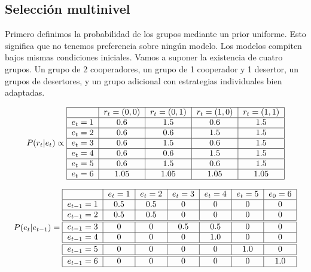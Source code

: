 \documentclass[a4paper,10pt]{article}
\begin{document}
\subsection{Selección multinivel}

Primero definimos la probabilidad de los grupos mediante un prior uniforme.
Esto significa que no tenemos preferencia sobre ningún modelo.
Los modelos compiten bajos mismas condiciones iniciales.
Vamos a suponer la existencia de cuatro grupos.
Un grupo de 2 cooperadores, un grupo de 1 cooperador y 1 desertor, un grupos de desertores, y un grupo adicional con estrategias individuales bien adaptadas.

\begin{align}
\centering
P(r_{t}|e_{t}) \propto \begin{tabular}{|c|c|c|c|c|c|c|}
        \hline
        & $r_t=(0,0)$ & $r_t=(0,1)$ & $r_t=(1,0)$ &  $r_t=(1,1)$  \\ \hline
       $e_{t}=1$ & $0.6$ & $1.5$ & $0.6$ & $1.5$ \\ \hline
       $e_{t}=2$ & $0.6$ & $0.6$ & $1.5$ & $1.5$  \\ \hline
       $e_{t}=3$ & $0.6$ & $1.5$ & $0.6$ & $1.5$  \\ \hline
       $e_{t}=4$ & $0.6$ & $0.6$ & $1.5$ & $1.5$ \\ \hline
       $e_{t}=5$ & $0.6$ & $1.5$ & $0.6$ & $1.5$ \\ \hline
       $e_{t}=6$ & $1.05$ & $1.05$ & $1.05$ & $1.05$  \\ \hline
\end{tabular}
\end{align}





\begin{align}
\centering
P(e_{t}|e_{t-1}) = \begin{tabular}{|c|c|c|c|c|c|c|}
        \hline
        & $e_t=1$ & $e_t=2$ & $e_t=3$ &  $e_t=4$ & $e_t=5$ & $e_0=6$ \\ \hline
       $e_{t-1}=1$ & $0.5$ & $0.5$ & $0$ &  $0$ & $0$ & $0$ \\ \hline
       $e_{t-1}=2$ & $0.5$ & $0.5$ & $0$ & $0$ & $0$ & $0$ \\ \hline \hline
       $e_{t-1}=3$ & $0$ & $0$ & $0.5$ & $0.5$ & $0$ & $0$ \\ \hline
       $e_{t-1}=4$ & $0$ & $0$ & $0$ & $1.0$ & $0$ & $0$ \\ \hline \hline
       $e_{t-1}=5$ & $0$ & $0$ & $0$ & $0$ & $1.0$ & $0$ \\ \hline \hline
       $e_{t-1}=6$ & $0$ & $0$ & $0$ & $0$ & $0$ & $1.0$ \\ \hline
\end{tabular}
\end{align}
\end{document}
